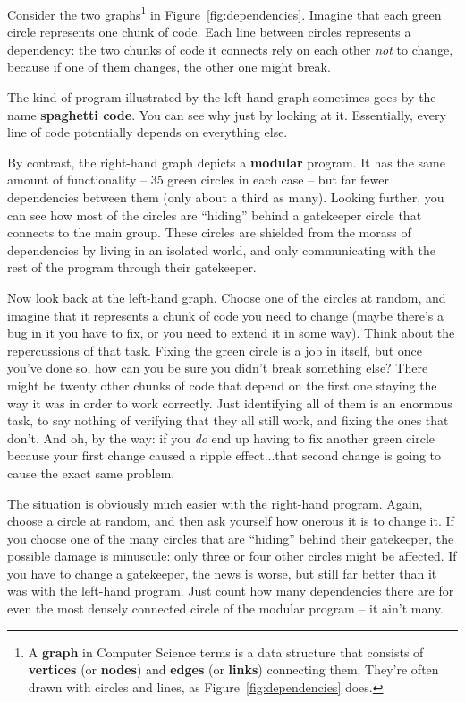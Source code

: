 Consider the two graphs\footnote{A \textbf{graph} in Computer Science terms is
a data structure that consists of \textbf{vertices} (or \textbf{nodes}) and
\textbf{edges} (or \textbf{links}) connecting them. They're often drawn with
circles and lines, as Figure~\ref{fig:dependencies} does.} in
Figure~\ref{fig:dependencies}. Imagine that each green circle represents one
chunk of code. Each line between circles represents a dependency: the two
chunks of code it connects rely on each other \textit{not} to change, because
if one of them changes, the other one might break.

The kind of program illustrated by the left-hand graph sometimes goes by the
name \textbf{spaghetti code}. You can see why just by looking at it.
Essentially, every line of code potentially depends on everything else.

By contrast, the right-hand graph depicts a \textbf{modular} program. It has
the same amount of functionality -- 35 green circles in each case -- but far
fewer dependencies between them (only about a third as many). Looking further,
you can see how most of the circles are ``hiding'' behind a gatekeeper circle
that connects to the main group. These circles are shielded from the morass of
dependencies by living in an isolated world, and only communicating with the
rest of the program through their gatekeeper.

Now look back at the left-hand graph. Choose one of the circles at random, and
imagine that it represents a chunk of code you need to change (maybe there's a
bug in it you have to fix, or you need to extend it in some way). Think about
the repercussions of that task. Fixing the green circle is a job in itself,
but once you've done so, how can you be sure you didn't break something else?
There might be twenty other chunks of code that depend on the first one
staying the way it was in order to work correctly. Just identifying all of
them is an enormous task, to say nothing of verifying that they all still
work, and fixing the ones that don't. And oh, by the way: if you \textit{do}
end up having to fix another green circle because your first change caused a
ripple effect...that second change is going to cause the exact same problem.

The situation is obviously much easier with the right-hand program. Again,
choose a circle at random, and then ask yourself how onerous it is to change
it. If you choose one of the many circles that are ``hiding'' behind their
gatekeeper, the possible damage is minuscule: only three or four other circles
might be affected. If you have to change a gatekeeper, the news is worse, but
still far better than it was with the left-hand program. Just count how many
dependencies there are for even the most densely connected circle of the
modular program -- it ain't many.


